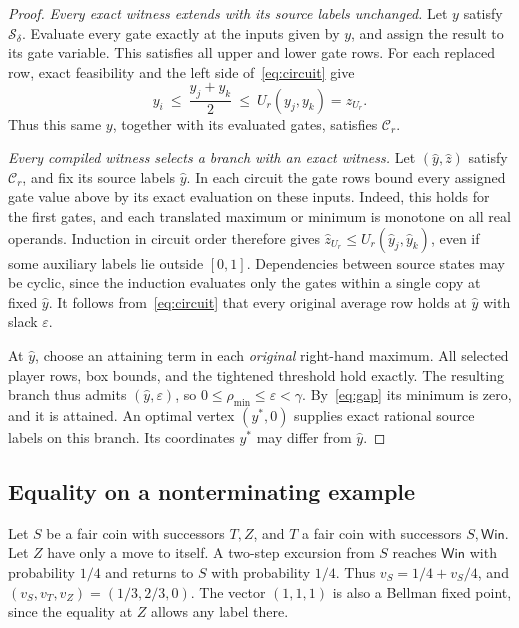 \documentclass[11pt,letterpaper]{article}
\newcommand{\Win}{\mathsf{Win}}
\newcommand{\sys}{\mathcal S}
\newcommand{\compiled}{\mathcal C}
\begin{document}
\begin{proof}
\emph{Every exact witness extends with its source labels unchanged.}
Let \(y\) satisfy \(\sys_\delta\). Evaluate every gate exactly at the inputs
given by \(y\), and assign the result to its gate variable. This satisfies all
upper and lower gate rows. For each replaced row, exact feasibility and
the left side of~\eqref{eq:circuit} give
\[
                y_i\ \le\ \frac{y_j+y_k}{2}\ \le\ U_r(y_j,y_k)=z_{U_r}.
\]
Thus this same \(y\), together with its evaluated gates, satisfies \(\compiled_r\).

\emph{Every compiled witness selects a branch with an exact witness.}
Let \((\hat y,\hat z)\) satisfy \(\compiled_r\), and fix its source labels \(\hat y\).
In each circuit the gate rows bound every assigned gate value above by its exact
evaluation on these inputs. Indeed, this holds for the first gates, and each translated
maximum or minimum is monotone on all real operands. Induction in circuit order
therefore gives \(\hat z_{U_r}\le U_r(\hat y_j,\hat y_k)\), even if some auxiliary
labels lie outside \([0,1]\). Dependencies between source states may be cyclic,
since the induction evaluates only the gates within a single copy at fixed \(\hat y\).
It follows from~\eqref{eq:circuit} that every original average row holds at
\(\hat y\) with slack \(\varepsilon\).

At \(\hat y\), choose an attaining term in each \emph{original} right-hand maximum.
All selected player rows, box bounds, and the tightened threshold hold exactly.
The resulting branch thus admits \((\hat y,\varepsilon)\), so
\(0\le\rho_{\min}\le\varepsilon<\gamma\). By~\eqref{eq:gap} its minimum is
zero, and it is attained. An optimal vertex \((y^*,0)\) supplies exact rational
source labels on this branch. Its coordinates \(y^*\) may differ from \(\hat y\).
\end{proof}

\subsection{Equality on a nonterminating example}

Let \(S\) be a fair coin with successors \(T,Z\), and \(T\) a fair coin with
successors \(S,\Win\). Let \(Z\) have only a move to itself. A two-step excursion
from \(S\) reaches \(\Win\) with probability \(1/4\) and returns to \(S\) with
probability \(1/4\). Thus \(v_S=1/4+v_S/4\), and
\((v_S,v_T,v_Z)=(1/3,2/3,0)\). The vector \((1,1,1)\) is also a Bellman
fixed point, since the equality at \(Z\) allows any label there.
\end{document}
